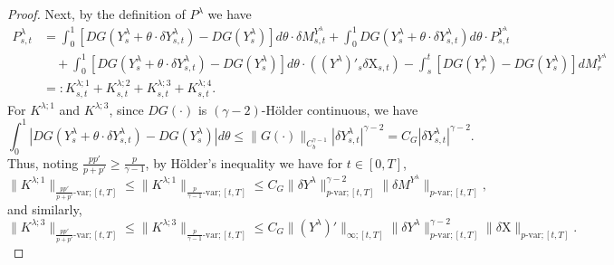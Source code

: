 \documentclass[11pt,reqno]{amsart}
\numberwithin{equation}{section}
\begin{document}
\begin{proof}
Next, by the definition of $P^{\lambda}$ we have 
\begin{align}\nonumber
P^{\lambda}_{s,t} &= \int_{0}^{1}\left[D G(Y^{\lambda}_{s} + \theta\cdot \delta Y^{\lambda}_{s,t}) - D G(Y^{\lambda}_{s})\right]d\theta \cdot \delta M^{Y^{\lambda}}_{s,t} + \int_{0}^{1}D G(Y^{\lambda}_s + \theta \cdot \delta Y^{\lambda}_{s,t} )d\theta \cdot  P^{Y^{\lambda}}_{s,t}\\ \nonumber
&\quad + \int_{0}^{1} \left[D G(Y^{\lambda}_{s} + \theta \cdot \delta Y^{\lambda}_{s,t} ) - D G(Y^{\lambda}_{s})\right] d\theta \cdot ((Y^{\lambda})'_{s} \delta\mathrm X_{s,t}) - \int_{s}^{t} \left[D G(Y^{\lambda}_{r}) - D G(Y^{\lambda}_{s})\right]dM^{Y^{\lambda}}_{r}\\ \label{e:R^lambda}
&=: K^{\lambda;1}_{s,t} + K^{\lambda;2}_{s,t} + K^{\lambda;3}_{s,t} + K^{\lambda;4}_{s,t}.
\end{align}
For $K^{\lambda;1}$ and $K^{\lambda;3}$, since $DG(\bm\cdot)$ is $(\gamma - 2)$-H\"older continuous, we have
\begin{equation*}
\int_{0}^{1}|DG(Y^{\lambda}_{s} + \theta\cdot \delta Y^{\lambda}_{s,t}) - DG(Y^{\lambda}_{s})| d\theta \le \|G(\bm\cdot)\|_{C^{\gamma-1}_b} |\delta Y^{\lambda}_{s,t}|^{\gamma - 2} = C_G |\delta Y^{\lambda}_{s,t}|^{\gamma - 2}.
\end{equation*}
Thus, noting $\frac{pp'}{p+p'} \ge \frac{p}{\gamma - 1}$, by H\"older's inequality we have for $t\in [0,T]$, 
\begin{equation}\label{e:K lambda 1}
\|K^{\lambda;1}\|_{\frac{pp'}{p+p'}\text{-}\mathrm{var};[t,T]} \le \|K^{\lambda;1}\|_{\frac{p}{\gamma - 1}\text{-}\mathrm{var};[t,T]} \le C_{G} \|\delta Y^{\lambda}\|^{\gamma - 2}_{p\text{-}\mathrm{var};[t,T]} \|\delta M^{Y^{\lambda}}\|_{p\text{-}\mathrm{var};[t,T]},
\end{equation}
and similarly, 
\begin{equation}\label{e:K lambda 3}
\|K^{\lambda;3}\|_{\frac{pp'}{p+p'}\text{-}\mathrm{var};[t,T]} \le \|K^{\lambda;3}\|_{\frac{p}{\gamma - 1}\text{-}\mathrm{var};[t,T]}\le C_{G} \|(Y^{\lambda})'\|_{\infty;[t,T]} \|\delta Y^{\lambda}\|^{\gamma - 2}_{p\text{-}\mathrm{var};[t,T]} \|\delta \mathrm X\|_{p\text{-}\mathrm{var};[t,T]}.
\end{equation} 


\end{proof}
\end{document}
